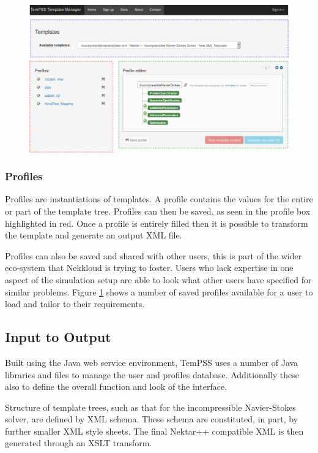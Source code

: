 \documentclass[11pt, a4paper]{report}
\begin{document}
\begin{figure}[htb!]
 \centering
 \includegraphics[width=.85\linewidth,  clip=true, trim = 0cm 0cm 0cm 0cm]{TemPSS_interface}
 \label{fig:TemPSS_interface}
\end{figure}

\subsubsection{Profiles}
Profiles are instantiations of templates. A profile contains the values for the entire or part of the template tree. Profiles can then be saved, as seen in the profile box highlighted in \textcolor{myred}{red}. Once a profile is entirely filled then it is possible to transform the template and generate an output XML file.

Profiles can also be saved and shared with other users, this is part of the wider eco-system that Nekkloud is trying to foster. Users who lack expertise in one aspect of the simulation setup are able to look what other users have specified for similar problems. Figure \ref{fig:TemPSS_interface} shows a number of saved profiles available for a user to load and tailor to their requirements.

\subsection{Input to Output}
Built using the Java web service environment, TemPSS uses a number of Java libraries and files to manage the user and profiles database. Additionally these also to define the overall function and look of the interface. 

Structure of template trees, such as that for the incompressible Navier-Stokes solver, are defined by XML schema. These schema are constituted, in part, by further smaller XML style sheets. The final Nektar++ compatible XML is then generated through an XSLT transform.
\end{document}
